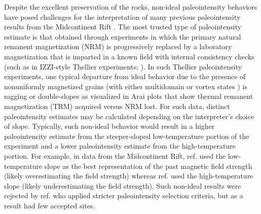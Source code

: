 \documentclass[9pt,twocolumn,twoside,lineno]{pnas-new}
\begin{document}
Despite the excellent preservation of the rocks, non-ideal paleointensity behaviors have posed challenges for the interpretation of many previous paleointensity results from the Midcontinent Rift \cite{Pesonen1983a, Kulakov2013a, Sprain2018a}. The most trusted type of paleointensity estimate is that obtained through experiments in which the primary natural remanent magnetization (NRM) is progressively replaced by a laboratory magnetization that is imparted in a known field with internal consistency checks (such as in IZZI-style Thellier experiments;  \citealp{Yu2004a}). In such Thellier paleointensity experiments, one typical departure from ideal behavior due to the presence of nonuniformly magnetized grains (with either multidomain \cite{Dunlop2001a} or vortex states \cite{Tauxe2020a}) is sagging or double-slopes as visualized in Arai plots that show thermal remanent magnetization (TRM) acquired versus NRM lost. For such data, distinct paleointensity estimates may be calculated depending on the interpreter's choice of slope. Typically, such non-ideal behavior would result in a higher paleointensity estimate from the steeper-sloped low-temperature portion of the experiment and a lower paleointensity estimate from the high-temperature portion. For example, in data from the Midcontinent Rift, ref. \citealp{Pesonen1983a} used the low-temperature slope as the best representation of the past magnetic field strength (likely overestimating the field strength) whereas ref. \citealp{Kulakov2013a} used the high-temperature slope (likely underestimating the field strength). Such non-ideal results were rejected by ref. \citealp{Sprain2018a} who applied stricter paleointensity selection criteria, but as a result had few accepted sites.
\end{document}
